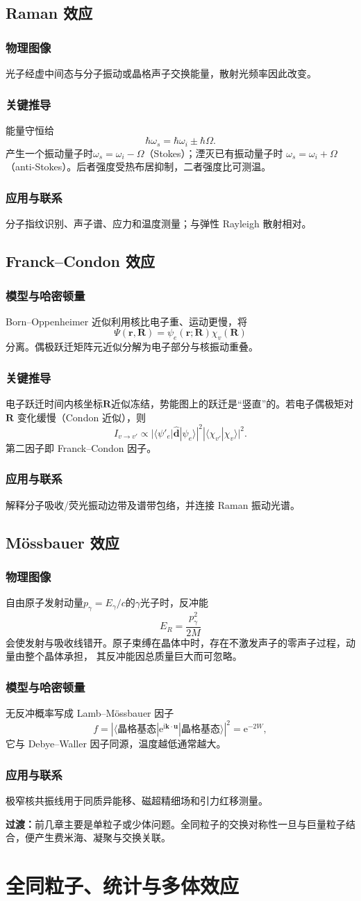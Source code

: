 \documentclass[12pt,a4paper,openany,fontset=fandol]{ctexrep}
\newcommand{\ii}{\mathrm{i}}
\newcommand{\ee}{\mathrm{e}}
\newcommand{\Physical}{\subsection*{物理图像}}
\newcommand{\Model}{\subsection*{模型与哈密顿量}}
\newcommand{\Derivation}{\subsection*{关键推导}}
\newcommand{\Application}{\subsection*{应用与联系}}
\newcommand{\trans}[1]{\par\medskip\noindent\textcolor{blue!55!black}{\textbf{过渡：}}#1\par\medskip}
\begin{document}
\section{Raman 效应}
\Physical
光子经虚中间态与分子振动或晶格声子交换能量，散射光频率因此改变。
\Derivation
能量守恒给
\begin{equation}\hbar\omega_s=\hbar\omega_i\pm\hbar\Omega.\end{equation}
产生一个振动量子时$\omega_s=\omega_i-\Omega$（Stokes）；湮灭已有振动量子时
$\omega_s=\omega_i+\Omega$（anti-Stokes）。后者强度受热布居抑制，二者强度比可测温。
\Application
分子指纹识别、声子谱、应力和温度测量；与弹性 Rayleigh 散射相对。

\section{Franck--Condon 效应}
\Model
Born--Oppenheimer 近似利用核比电子重、运动更慢，将
\[
\Psi(\bm r,\bm R)=\psi_e(\bm r;\bm R)\chi_v(\bm R)
\]
分离。偶极跃迁矩阵元近似分解为电子部分与核振动重叠。
\Derivation
电子跃迁时间内核坐标$\bm R$近似冻结，势能图上的跃迁是“竖直”的。若电子偶极矩对$\bm R$
变化缓慢（Condon 近似），则
\begin{equation}I_{v\to v'}\propto
|\langle\psi'_e|\hat{\bm d}|\psi_e\rangle|^2
|\langle\chi_{v'}|\chi_v\rangle|^2.\end{equation}
第二因子即 Franck--Condon 因子。
\Application
解释分子吸收/荧光振动边带及谱带包络，并连接 Raman 振动光谱。

\section{Mössbauer 效应}
\Physical
自由原子发射动量$p_\gamma=E_\gamma/c$的$\gamma$光子时，反冲能
\begin{equation}E_R=\frac{p_\gamma^2}{2M}\end{equation}
会使发射与吸收线错开。原子束缚在晶体中时，存在不激发声子的零声子过程，动量由整个晶体承担，
其反冲能因总质量巨大而可忽略。
\Model
无反冲概率写成 Lamb--Mössbauer 因子
\[
f=|\langle\text{晶格基态}|\ee^{\ii\bm k\cdot\bm u}|
\text{晶格基态}\rangle|^2=\ee^{-2W},
\]
它与 Debye--Waller 因子同源，温度越低通常越大。
\Application
极窄核共振线用于同质异能移、磁超精细场和引力红移测量。
\trans{前几章主要是单粒子或少体问题。全同粒子的交换对称性一旦与巨量粒子结合，便产生费米海、凝聚与交换关联。}

\chapter{全同粒子、统计与多体效应}
\end{document}
